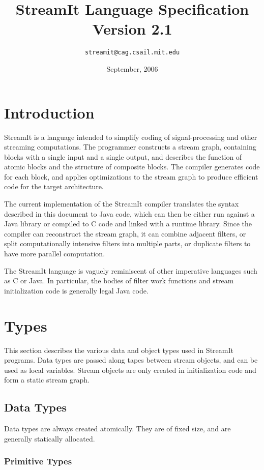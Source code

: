 \documentclass[11pt]{article}
\title{StreamIt Language Specification\\
Version 2.1}
\author{\texttt{streamit@cag.csail.mit.edu}}
\date{September, 2006}
\begin{document}
\maketitle
\tableofcontents

\section{Introduction}

StreamIt is a language intended to simplify coding of
signal-processing and other streaming computations.  The programmer
constructs a stream graph, containing blocks with a single input and a
single output, and describes the function of atomic blocks and the
structure of composite blocks.  The compiler generates code for each
block, and applies optimizations to the stream graph to produce
efficient code for the target architecture.

The current implementation of the StreamIt compiler translates the
syntax described in this document to Java code, which can then be
either run against a Java library or compiled to C code and linked
with a runtime library.  Since the compiler can reconstruct the stream
graph, it can combine adjacent filters, or split computationally
intensive filters into multiple parts, or duplicate filters to have
more parallel computation.

The StreamIt language is vaguely reminiscent of other imperative
languages such as C or Java.  In particular, the bodies of filter work
functions and stream initialization code is generally legal Java
code.

\section{Types}

This section describes the various data and object types used in
StreamIt programs.  Data types are passed along tapes between stream
objects, and can be used as local variables.  Stream objects are only
created in initialization code and form a static stream graph.

\subsection{Data Types}

Data types are always created atomically.  They are of fixed size, and
are generally statically allocated.

\subsubsection{Primitive Types}
\label{sec:primitive-types}
\end{document}

